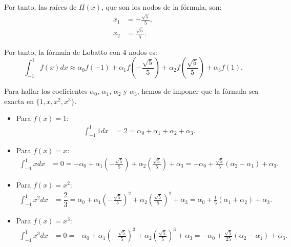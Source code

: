 \begin{ejercicio}
\begin{enumerate}
        Por tanto, las raíces de $\Pi(x)$, que son los nodos de la fórmula, son:
        \begin{align*}
            x_1 &= -\frac{\sqrt{5}}{5},\\
            x_2 &= \frac{\sqrt{5}}{5}.
        \end{align*}

        Por tanto, la fórmula de Lobatto con 4 nodos es:
        \begin{equation*}
            \int_{-1}^{1} f(x) dx \approx \alpha_0 f(-1) + \alpha_1 f\left(-\frac{\sqrt{5}}{5}\right) + \alpha_2 f\left(\frac{\sqrt{5}}{5}\right) + \alpha_3 f(1).
        \end{equation*}

        Para hallar los coeficientes $\alpha_0$, $\alpha_1$, $\alpha_2$ y $\alpha_3$, hemos de imponer que la fórmula sea exacta en $\{1,x,x^2,x^3\}$.
        \begin{itemize}
            \item Para $f(x) = 1$:
            \begin{align*}
                \int_{-1}^{1} 1 dx &= 2 = \alpha_0 + \alpha_1 + \alpha_2 + \alpha_3.
            \end{align*}
            \item Para $f(x) = x$:
            \begin{align*}
                \int_{-1}^{1} x dx &= 0 = -\alpha_0 + \alpha_1\left(-\frac{\sqrt{5}}{5}\right) + \alpha_2\left(\frac{\sqrt{5}}{5}\right) + \alpha_3
                = -\alpha_0 + \frac{\sqrt{5}}{5}(\alpha_2 - \alpha_1) + \alpha_3.
            \end{align*}
            \item Para $f(x) = x^2$:
            \begin{align*}
                \int_{-1}^{1} x^2 dx &= \dfrac{2}{3} = \alpha_0 + \alpha_1\left(-\frac{\sqrt{5}}{5}\right)^2 + \alpha_2\left(\frac{\sqrt{5}}{5}\right)^2 + \alpha_3
                = \alpha_0 + \frac{1}{5}(\alpha_1 + \alpha_2) + \alpha_3.
            \end{align*}
            \item Para $f(x) = x^3$:
            \begin{align*}
                \int_{-1}^{1} x^3 dx &= 0 = -\alpha_0 + \alpha_1\left(-\frac{\sqrt{5}}{5}\right)^3 + \alpha_2\left(\frac{\sqrt{5}}{5}\right)^3 + \alpha_3
                = -\alpha_0 + \frac{\sqrt{5}}{25}(\alpha_2 - \alpha_1) + \alpha_3.
            \end{align*}
        \end{itemize}


\end{enumerate}
\end{ejercicio}
